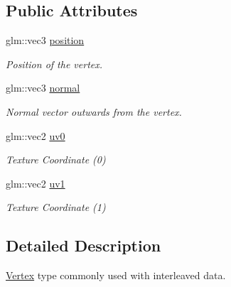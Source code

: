 \subsection*{Public Attributes}
\begin{DoxyCompactItemize}
\item 
\mbox{\label{structblaze_1_1Vertex_a1e1592274327ef0a3c655b85826af54b}} 
glm\+::vec3 \hyperlink{structblaze_1_1Vertex_a1e1592274327ef0a3c655b85826af54b}{position}
\begin{DoxyCompactList}\small\item\em Position of the vertex. \end{DoxyCompactList}\item 
\mbox{\label{structblaze_1_1Vertex_ab0bb46f8b4ffc80a6c622e629401a5fd}} 
glm\+::vec3 \hyperlink{structblaze_1_1Vertex_ab0bb46f8b4ffc80a6c622e629401a5fd}{normal}
\begin{DoxyCompactList}\small\item\em Normal vector outwards from the vertex. \end{DoxyCompactList}\item 
\mbox{\label{structblaze_1_1Vertex_acc8d9d8254c0515edad905e50126ce2b}} 
glm\+::vec2 \hyperlink{structblaze_1_1Vertex_acc8d9d8254c0515edad905e50126ce2b}{uv0}
\begin{DoxyCompactList}\small\item\em Texture Coordinate (0) \end{DoxyCompactList}\item 
\mbox{\label{structblaze_1_1Vertex_afee0041ee5ef260ac1418119a2b132e5}} 
glm\+::vec2 \hyperlink{structblaze_1_1Vertex_afee0041ee5ef260ac1418119a2b132e5}{uv1}
\begin{DoxyCompactList}\small\item\em Texture Coordinate (1) \end{DoxyCompactList}\end{DoxyCompactItemize}


\subsection{Detailed Description}
\hyperlink{structblaze_1_1Vertex}{Vertex} type commonly used with interleaved data. 

